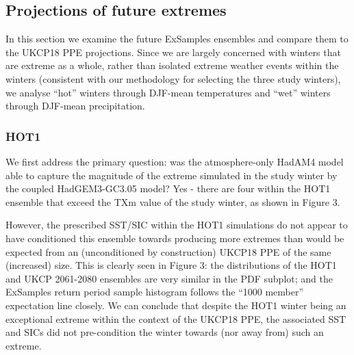   \subsection{Projections of future extremes}

    In this section we examine the future ExSamples ensembles and compare them to the UKCP18 PPE projections. Since we are largely concerned with winters that are extreme as a whole, rather than isolated extreme weather events within the winters (consistent with our methodology for selecting the three study winters), we analyse ``hot'' winters through DJF-mean temperatures and ``wet'' winters through DJF-mean precipitation.

    \subsubsection{HOT1}

      We first address the primary question: was the atmosphere-only HadAM4 model able to capture the magnitude of the extreme simulated in the study winter by the coupled HadGEM3-GC3.05 model? Yes - there are four within the HOT1 ensemble that exceed the TXm value of the study winter, as shown in Figure 3.
      
      However, the prescribed SST/SIC within the HOT1 simulations do not appear to have conditioned this ensemble towards producing more extremes than would be expected from an (unconditioned by construction) UKCP18 PPE of the same (increased) size. This is clearly seen in Figure 3: the distributions of the HOT1 and UKCP 2061-2080 ensembles are very similar in the PDF subplot; and the ExSamples return period sample histogram follows the ``1000 member'' expectation line closely. We can conclude that despite the HOT1 winter being an exceptional extreme within the context of the UKCP18 PPE, the associated SST and SICs did not pre-condition the winter towards (nor away from) such an extreme.
      

